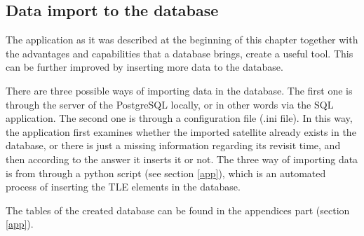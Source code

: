 \bigskip
\subsection{Data import to the database}
\bigskip

The application as it was described at the beginning of this chapter together with the advantages and capabilities that a database brings, create a useful tool. This can be further improved by inserting more data to the database.

There are three possible ways of importing data in the database. The first one is through the server of the PostgreSQL locally, or in other words via the SQL application. The second one is through a configuration file (.ini file). In this way, the application first examines whether the imported satellite already exists in the database, or there is just a missing information regarding its revisit time, and then according to the answer it inserts it or not. The three way of importing data is from through a python script (see section \ref{app}), which is an automated process of inserting the TLE elements in the database.


\bigskip
The tables of the created database can be found in the appendices part (section \ref{app}).